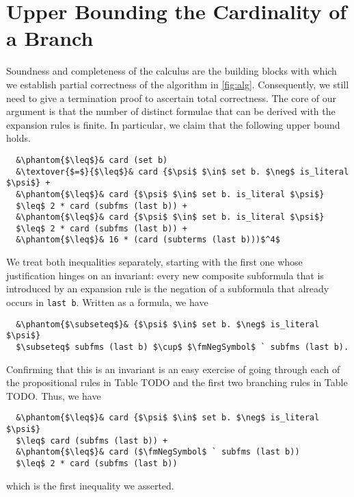 \documentclass[sigplan,10pt,anonymous,review]{acmart}
\newcommand{\textover}[3][l]{%
 \makebox[\widthof{#3}][#1]{#2}%
}
\newcommand{\fmNegSymbol}{\boldsymbol{\neg}}
\begin{document}
\section{Upper Bounding the Cardinality of a Branch\label{sec:upper}}
Soundness and completeness of the calculus are the building blocks with which we establish partial correctness of the algorithm in \autoref{fig:alg}.
Consequently, we still need to give a termination proof to ascertain total correctness.
The core of our argument is that the number of distinct formulae that can be derived with the expansion rules is finite.
In particular, we claim that the following upper bound holds.
\begin{lstlisting}
  &\phantom{$\leq$}& card (set b)
  &\textover{$=$}{$\leq$}& card {$\psi$ $\in$ set b. $\neg$ is_literal $\psi$} +
  &\phantom{$\leq$}& card {$\psi$ $\in$ set b. is_literal $\psi$}
  $\leq$ 2 * card (subfms (last b)) +
  &\phantom{$\leq$}& card {$\psi$ $\in$ set b. is_literal $\psi$}
  $\leq$ 2 * card (subfms (last b)) +
  &\phantom{$\leq$}& 16 * (card (subterms (last b)))$^4$
\end{lstlisting}
We treat both inequalities separately, starting with the first one whose justification hinges on an invariant: 
every new composite subformula that is introduced by an expansion rule is the negation of a subformula that already occurs in \lstinline!last b!.
Written as a formula, we have
\begin{lstlisting}
  &\phantom{$\subseteq$}& {$\psi$ $\in$ set b. $\neg$ is_literal $\psi$}
  $\subseteq$ subfms (last b) $\cup$ $\fmNegSymbol$ ` subfms (last b).
\end{lstlisting}
Confirming that this is an invariant is an easy exercise of going through each of the propositional rules in Table TODO and the first two branching rules in Table TODO.
Thus, we have
\begin{lstlisting}
  &\phantom{$\leq$}& card {$\psi$ $\in$ set b. $\neg$ is_literal $\psi$}
  $\leq$ card (subfms (last b)) +
  &\phantom{$\leq$}& card ($\fmNegSymbol$ ` subfms (last b))
  $\leq$ 2 * card (subfms (last b))
\end{lstlisting}
which is the first inequality we asserted. 
\end{document}
